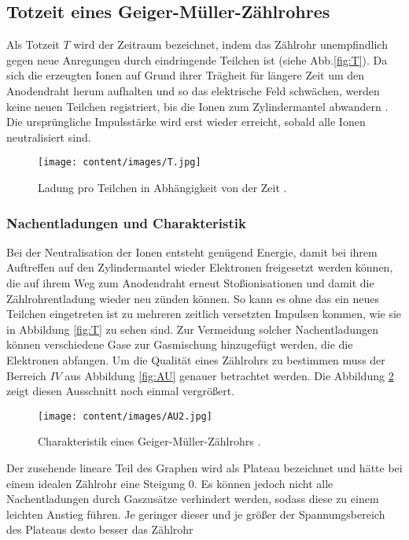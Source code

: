 \subsection{Totzeit eines Geiger-Müller-Zählrohres}
Als Totzeit $T$ wird der Zeitraum bezeichnet, indem das Zählrohr unempfindlich gegen neue Anregungen durch eindringende Teilchen ist (siehe Abb.\ref{fig:T}).
Da sich die erzeugten Ionen auf Grund ihrer Trägheit für längere Zeit um den Anodendraht herum aufhalten und so das elektrische Feld schwächen, werden keine neuen Teilchen registriert, bis die Ionen zum Zylindermantel abwandern \cite{V703}. Die ursprüngliche Impulsstärke wird erst wieder erreicht, sobald alle Ionen neutralisiert sind.\begin{figure}
\centering
\texttt{[image: content/images/T.jpg]}
\caption{Ladung pro Teilchen in Abhängigkeit von der Zeit \cite{V703}.}
\label{fig:TZ}
\end{figure}
\subsubsection{Nachentladungen und Charakteristik}
Bei der Neutralisation der Ionen entsteht genügend Energie, damit bei ihrem Auftreffen auf den Zylindermantel wieder Elektronen freigesetzt werden können, die auf ihrem Weg zum Anodendraht erneut Stoßionisationen  und damit die Zählrohrentladung wieder neu zünden können.
So kann es ohne das ein neues Teilchen eingetreten ist zu mehreren zeitlich versetzten Impulsen kommen, wie sie in Abbildung \ref{fig:T} zu sehen sind. Zur Vermeidung solcher Nachentladungen können verschiedene Gase zur Gasmischung hinzugefügt werden, die die Elektronen abfangen.\newline
Um die Qualität eines Zählrohrs zu bestimmen muss der Berreich $IV$ aus Abbildung \ref{fig:AU} genauer betrachtet werden. Die Abbildung \ref{fig:AU2} zeigt diesen Ausschnitt noch einmal vergrößert.
\begin{figure}
\centering
\texttt{[image: content/images/AU2.jpg]}
\caption{Charakteristik eines Geiger-Müller-Zählrohrs \cite{V703}.}
\label{fig:AU2}
\end{figure}
Der zusehende lineare Teil des Graphen wird als Plateau bezeichnet und hätte bei einem idealen Zählrohr eine Steigung 0.
Es können jedoch nicht alle Nachentladungen durch Gaszusätze verhindert werden, sodass diese zu einem leichten Anstieg führen.
Je geringer dieser und je größer der Spannungsbereich des Plateaus desto besser das Zählrohr
